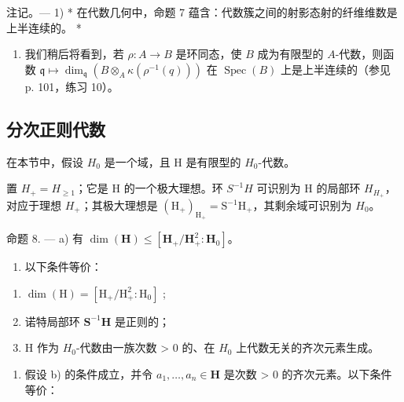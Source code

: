 注记。--- 1) * 在代数几何中，命题 7 蕴含：代数簇之间的射影态射的纤维维数是上半连续的。 *

\begin{enumerate}
\def\labelenumi{\arabic{enumi})}
\setcounter{enumi}{1}
\tightlist
\item
  我们稍后将看到，若 \(\rho:A\to B\) 是环同态，使 \(B\) 成为有限型的 \(A\)-代数，则函数 \(\mathfrak{q}\mapsto\dim_{\mathfrak{q}}(B\otimes_{A}\kappa(\rho^{-1}(q)))\) 在 \(\operatorname{Spec}(B)\) 上是上半连续的（参见 p. 101，练习 10）。
\end{enumerate}

\subsection{分次正则代数}

在本节中，假设 \(H_{0}\) 是一个域，且 H 是有限型的 \(H_{0}\)-代数。

置 \(H_{+} = H_{\geqslant 1}\)；它是 H 的一个极大理想。环 \(S^{-1}H\) 可识别为 H 的局部环 \(H_{H_{+}}\)，对应于理想 \(H_{+}\)；其极大理想是 \((\mathrm{H}_{+})_{\mathrm{H}_{+}} = \mathrm{S}^{-1}\mathrm{H}_{+}\)，其剩余域可识别为 \(H_{0}\)。

命题 8. --- a) 有 \(\dim(\mathbf{H}) \leqslant [\mathbf{H}_{+}/\mathbf{H}_{+}^{2}:\mathbf{H}_{0}]\)。

\begin{enumerate}
\def\labelenumi{\alph{enumi})}
\setcounter{enumi}{1}
\tightlist
\item
  以下条件等价：
\end{enumerate}

\begin{enumerate}
\def\labelenumi{(\roman{enumi})}
\item
  \(\dim (\mathrm{H}) = [\mathrm{H}_{+} / \mathrm{H}_{+}^{2}:\mathrm{H}_{0}]\) ;
\item
  诺特局部环 \(\mathbf{S}^{-1}\mathbf{H}\) 是正则的；
\item
  H 作为 \(H_{0}\)-代数由一族次数 \textgreater{} 0 的、在 \(H_{0}\) 上代数无关的齐次元素生成。
\end{enumerate}

\begin{enumerate}
\def\labelenumi{\alph{enumi})}
\setcounter{enumi}{2}
\tightlist
\item
  假设 b) 的条件成立，并令 \(a_{1}, \ldots, a_{n} \in \mathbf{H}\) 是次数 \textgreater{} 0 的齐次元素。以下条件等价：
\end{enumerate}

